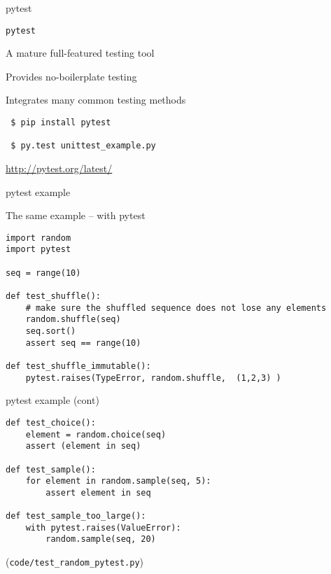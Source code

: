 \documentclass{beamer}
\begin{document}
\begin{frame}[fragile]{pytest}

{\LARGE \verb|pytest|}

\vfill
{\Large \hspace{0.2in} A mature full-featured testing tool}

\vfill
{\Large \hspace{0.2in} Provides no-boilerplate testing}

\vfill
{\Large \hspace{0.2in} Integrates many common testing methods}

\vfill
\begin{verbatim}
 $ pip install pytest

 $ py.test unittest_example.py 
\end{verbatim}

\vfill
\url{http://pytest.org/latest/}
\end{frame} 

\begin{frame}[fragile]{pytest example}

{\Large The same example -- with pytest}

{\small
\begin{verbatim}
import random
import pytest

seq = range(10)

def test_shuffle():
    # make sure the shuffled sequence does not lose any elements
    random.shuffle(seq)
    seq.sort()
    assert seq == range(10)

def test_shuffle_immutable():
    pytest.raises(TypeError, random.shuffle,  (1,2,3) )
\end{verbatim}
}

\end{frame} 

\begin{frame}[fragile]{pytest example (cont) }

{\small
\begin{verbatim}
def test_choice():
    element = random.choice(seq)
    assert (element in seq)

def test_sample():
    for element in random.sample(seq, 5):
        assert element in seq

def test_sample_too_large():
    with pytest.raises(ValueError):
        random.sample(seq, 20)
\end{verbatim}
}

\vfill
(\verb|code/test_random_pytest.py|)

\end{frame} 
\end{document}
